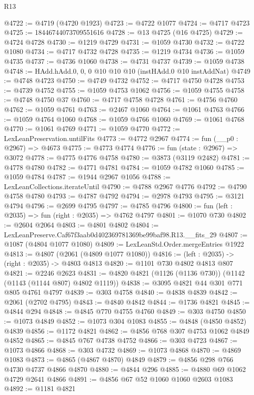 \begin{lexlean}{R13}
\begin{coremodule}
@4722 := @4719 (@4720 @1923)
@4723 := @4722 @1077
@4724 := @4717 @4723
@4725 := 18446744073709551616
@4728 := @13 @4725 (@16 @4725)
@4729 := @4724 @4728
@4730 := @1219 @4729
@4731 := @1059 @4730
@4732 := @4722 @1080
@4734 := @4717 @4732 @4728
@4735 := @1219 @4734
@4736 := @1059 @4735
@4737 := @4736 @1060
@4738 := @4731 @4737
@4739 := @1059 @4738
@4748 := HAdd.hAdd.{0, 0, 0} @10 @10 @10 (instHAdd.{0} @10 instAddNat)
@4749 := @4748 @4723
@4750 := @4749 @4732
@4752 := @4717 @4750 @4728
@4753 := @4739 @4752
@4755 := @1059 @4753 @1062
@4756 := @1059 @4755
@4758 := @4748 @4750 @37
@4760 := @4717 @4758 @4728
@4761 := @4756 @4760
@4762 := @1059 @4761
@4763 := @2467 @1060
@4764 := @1061 @4763
@4766 := @1059 @4764 @1060
@4768 := @1059 @4766 @1060
@4769 := @1061 @4768
@4770 := @1061 @4769
@4771 := @1059 @4770
@4772 := LexLeanPreservation.untilFits
@4773 := @4772 @2967
@4774 := fun (__p0 : @2967) => @4673
@4775 := @4773 @4774
@4776 := fun (state : @2967) => @3072
@4778 := @4775 @4776 @4758
@4780 := @3873 (@3119 @2482)
@4781 := @4778 @4780
@4782 := @4771 @4781
@4784 := @1059 @4782 @1060
@4785 := @1059 @4784
@4787 := @1944 @2967 @1056
@4788 := LexLeanCollections.iterateUntil
@4790 := @4788 @2967 @4776
@4792 := @4790 @4758 @4780
@4793 := @4787 @4792
@4794 := @2978 @4793
@4795 := @3121 @4794
@4796 := @2699 @4795
@4797 := @4785 @4796
@4800 := fun (left : @2035) => fun (right : @2035) => @4762 @4797
@4801 := @1070 @730
@4802 := @2604 @2064
@4803 := @4801 @4802
@4804 := LexLeanPreserve.Caf67f3aab0d402369781369be99baf98.R13.__fits_29
@4807 := @1087 (@4804 @1077 @1080)
@4809 := LexLeanStd.Order.mergeEntries @1922
@4813 := @4807 (@2061 (@4809 @1077 @1080))
@4816 := (left : @2035) -> (right : @2035) -> @4803 @4813
@4820 := @1101 @730 @4802 @4813 @807
@4821 := @2246 @2623
@4831 := @4820 @4821 (@1126 (@1136 @730)) (@1142 (@1143 (@1144 @807) @4802 @1119))
@4838 := @3095 @4821 @44 @301 @771 @805 @4761 @4797
@4839 := @303 @4758
@4840 := @4838 @4839
@4842 := @2061 (@2702 @4795)
@4843 := @4840 @4842
@4844 := @1736 @4821
@4845 := @4844 @294
@4848 := @4845 @770 @4755 @4760
@4849 := @303 @4750
@4850 := @1073 @4849
@4852 := @1073 @304 @1083
@4855 := @4848 (@4850 @4852) @4839
@4856 := @1172 @4821
@4862 := @4856 @768 @307 @4753 @1062 @4849 @4852
@4865 := @4845 @767 @4738 @4752
@4866 := @303 @4723
@4867 := @1073 @4866
@4868 := @303 @4732
@4869 := @1073 @4868
@4870 := @4869 @1083
@4873 := @4865 (@4867 @4870) @4849
@4879 := @4856 @298 @766 @4730 @4737 @4866 @4870
@4880 := @4844 @296
@4885 := @4880 @69 @1062 @4729 @2641 @4866
@4891 := @4856 @67 @52 @1060 @1060 @2603 @1083
@4892 := @1181 @4821

\end{coremodule}
\end{lexlean}
